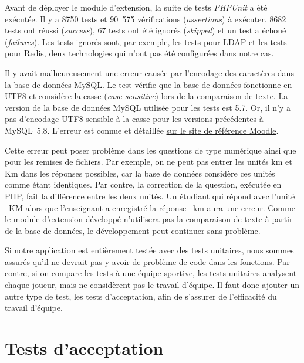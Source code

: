 Avant de déployer le module d'extension, la suite de tests \textit{PHPUnit} a été exécutée.
Il y a 8750 tests et 90~575 vérifications (\textit{assertions}) à exécuter.
8682 tests ont réussi (\textit{success}), 67 tests ont été ignorés (\textit{skipped}) et un test a échoué (\textit{failures}).
Les tests ignorés sont, par exemple, les tests pour LDAP et les tests pour Redis, deux technologies qui n'ont pas été configurées dans notre cas.

Il y avait malheureusement une erreur causée par l'encodage des caractères dans la base de données MySQL.
Le test vérifie que la base de données fonctionne en UTF8 et considère la casse (\textit{case-sensitive}) lors de la comparaison de texte.
La version de la base de données MySQL utilisée pour les tests est 5.7.
Or, il n'y a pas d'encodage UTF8 sensible à la casse pour les versions précédentes à MySQL~5.8.
L'erreur est connue et détaillée \href{https://docs.moodle.org/dev/Database_collation_issue}{sur le site de référence Moodle}.


Cette erreur peut poser problème dans les questions de type numérique ainsi que pour les remises de fichiers.
Par exemple, on ne peut pas entrer les unités \og km \fg{} et \og Km \fg{} dans les réponses possibles, car la base de données considère ces unités comme \'etant identiques.
Par contre, la correction de la question, exécutée en PHP, fait la différence entre les deux unités.
Un étudiant qui répond avec l'unité ~KM \fg{} alors que l'enseignant a enregistré la réponse ~km \fg{} aura une erreur.
Comme le module d'extension développé n'utilisera pas la comparaison de texte à partir de la base de données, le développement peut continuer sans problème.

Si notre application est entièrement testée avec des tests unitaires, nous sommes assurés qu'il ne devrait pas y avoir de problème de code dans les fonctions.
Par contre, si on compare les tests à une équipe sportive, les tests unitaires analysent chaque joueur, mais ne considèrent pas le travail d'équipe.
Il faut donc ajouter un autre type de test, les tests d'acceptation, afin de s'assurer de l'efficacité du travail d'équipe.

\section{Tests d'acceptation}

